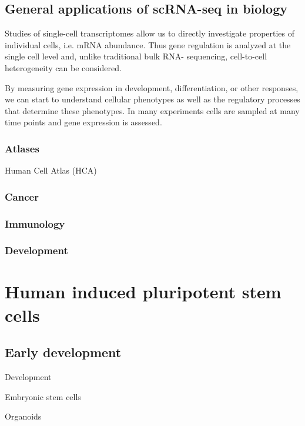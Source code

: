 \subsection{General applications of scRNA-seq in biology}

Studies of single-cell transcriptomes allow us to directly investigate properties of individual cells, i.e. mRNA abundance. 
Thus gene regulation is analyzed at the single cell level and, unlike traditional bulk RNA- sequencing, cell-to-cell heterogeneity can be considered.

By measuring gene expression in development, differentiation, or other responses, we can start to understand cellular phenotypes as well as the regulatory processes that determine these phenotypes. 
In many experiments cells are sampled at many time points and gene expression is assessed.

\subsubsection{Atlases}

Human Cell Atlas (HCA)
\subsubsection{Cancer}
\subsubsection{Immunology}
\subsubsection{Development}

\newpage

\section{Human induced pluripotent stem cells}  %

\subsection{Early development}

Development

Embryonic stem cells

Organoids



